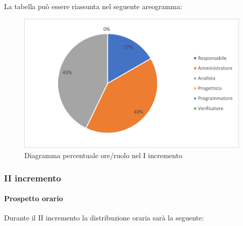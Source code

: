 La tabella può essere riassunta nel seguente areogramma:
\begin{figure}[H]
	\centering
	\includegraphics[width=0.8\linewidth]{res/images/preventivo/dettaglio_analisi/1-2.png}
	\caption{Diagramma percentuale ore/ruolo nel I incremento}
	\label{fig:diagramma costi ruolo  I incremento}
\end{figure}

\subsubsection{II incremento}
\paragraph{Prospetto orario}
Durante il II incremento la distribuzione oraria sarà la seguente:

